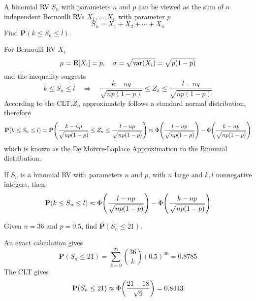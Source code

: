 \begin{example}[Binomial RV]
    A binomial RV $S_n$ with parameters $n$ and $p$ can be viewed as the sum of $n$ independent Bernoulli RVs $X_1, \ldots, X_n$ with parameter $p$
    \begin{equation}
        S_n = X_1 + X_2 + \cdots + X_n
    \end{equation}
    Find $\mathbf{P}(k \leq S_n \leq l)$.
\end{example}
\begin{solution}
    For Bernoulli RV $X_i$
    \begin{equation}
        \mu = \mathbf{E}[X_i] = p, \quad \sigma = \sqrt{\mathrm{var}(X_i)} = \sqrt{p(1-p)}
    \end{equation}
    and the inequality suggests
    \begin{equation}
        k \leq S_n \leq l \quad\Rightarrow\quad \frac{k - nq}{\sqrt{np(1-p)}} \leq Z_n \leq \frac{l - nq}{\sqrt{np(1-p)}}
    \end{equation}
    According to the CLT,$Z_n$ approximately follows a standard normal distribution, therefore
    \begin{equation}
        \mathbf{P}(k \leq S_n \leq l) = \mathbf{P}\qty(\frac{k - np}{\sqrt{np(1-p)}} \leq Z_n \leq \frac{l - np}{\sqrt{np(1-p)}}) \approx \Phi\qty(\frac{l - np}{\sqrt{np(1-p)}}) - \Phi\qty(\frac{k - np}{\sqrt{np(1-p)}})
    \end{equation}
    which is known as the De Moivre-Laplace Approximation to the Binomial distribution.
\end{solution}
\begin{theorem}
    If $S_n$ is a binomial RV with parameters $n$ and $p$, with $n$ large and $k, l$ nonnegative integers, then
    \begin{equation}
        \mathbf{P}(k \leq S_n \leq l) \approx \Phi\qty(\frac{l - np}{\sqrt{np(1-p)}}) - \Phi\qty(\frac{k - np}{\sqrt{np(1-p)}})
    \end{equation}
\end{theorem}
\begin{example}
    Given $n = 36$ and $p = 0.5$, find $\mathbf{P}(S_n \leq 21)$.
\end{example}
\begin{solution}
    An exact calculation gives
    \begin{equation}
        \mathbf{P}(S_n \leq 21) = \sum_{k=0}^{21} \binom{36}{k} (0.5)^{36} = 0.8785
    \end{equation}
    The CLT gives
    \begin{equation}
        \mathbf{P}(S_n \leq 21) \approx \Phi\qty(\frac{21 - 18}{\sqrt{9}}) = 0.8413
    \end{equation}
\end{solution}


